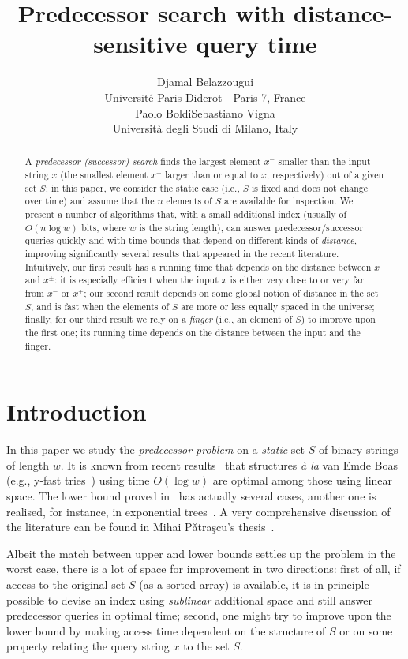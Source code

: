 \documentclass{article}
\title{Predecessor search with distance-sensitive query time}
\author{
Djamal Belazzougui\\
Universit\'e Paris Diderot---Paris 7, France\\
Paolo Boldi\quad Sebastiano Vigna\\
Universit\`a degli Studi di Milano, Italy}
\date{}
\newcommand{\?}{\mskip1.5mu}
\begin{document}
\maketitle
\thispagestyle{empty}



\begin{abstract}
A \emph{predecessor (successor) search} finds the largest element $x^-$ smaller
than the input string $x$ (the smallest element $x^+$ larger than or equal to
$x$, respectively) out of a given set $S$; in this paper, we consider
the static case (i.e., $S$ is fixed and does not change over time) and assume that
the $n$ elements of $S$ are available for inspection. We present a number of
algorithms that, with a small additional index (usually of $O(n\log w)$ bits,
where $w$ is the string length), can answer predecessor/successor queries
quickly and with time bounds that depend on different kinds of \emph{distance},
improving significantly several results that appeared in the recent literature.
Intuitively, our first result has a running time that depends on the distance
between $x$ and $x^\pm$: it is especially efficient when the input $x$ is
either very close to or very far from $x^-$ or $x^+$; our second result depends on some global notion of distance in the set $S$,
and is fast when the elements of $S$ are more or less equally spaced in the universe; finally, for our third result
we rely on a \emph{finger} (i.e., an element of $S$) to improve upon the first
one; its running time depends on the distance between the input and the
finger.
\end{abstract}

\section{Introduction}

In this paper we study the \emph{predecessor problem} on a \emph{static} set
$S$ of binary strings of length $w$. It is known from recent
results~\cite{PaTTSTOPS,PaTRDNHSP} that structures \emph{\` a la} van Emde Boas
(e.g., y-fast tries~\cite{WilLLWRQ}) using time $O(\log w)$ are optimal among those
using linear space. The lower bound proved in~\cite{PaTTSTOPS,PaTRDNHSP} has
actually several cases, another one is realised, for instance, in
exponential trees~\cite{AnTDOSEST}. A very comprehensive discussion 
of the literature can be found in Mihai P{\v a}tra{\c s}cu's
thesis~\cite{PatLBTDS}.

Albeit the match between upper and lower bounds settles up the problem in the
worst case, there is a lot of space for improvement in two directions: first of
all, if access to the original set $S$ (as a sorted array) is available, 
it is in principle possible to devise an index using \emph{sublinear} additional space
and still answer predecessor queries in optimal time; second, one might
try to improve upon the lower bound by making access time dependent on the
structure of $S$ or on some property relating the query string $x$ to the set
$S$.
\end{document}
